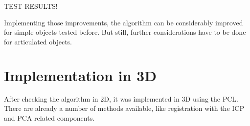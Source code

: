  TEST RESULTS!



Implementing those improvements, the algorithm can be considerably improved for simple objects tested before. But still, further considerations have to be done for articulated objects.


\chapter{Implementation in 3D}

After checking the algorithm in 2D, it was implemented in 3D using the PCL. There are already a number of methods available, like registration with the ICP and PCA related components.